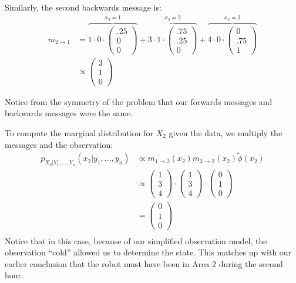 \documentclass[12pt]{article}
\begin{document}
{\begin{enumerate}[(a)]
            Similarly, the second backwards message is:
            \begin{align*}
                m_{2 \to 1} &= 
                \overbrace{1 \cdot 0 \cdot \begin{pmatrix} .25 \\ 0 \\ 0 \end{pmatrix}}^{x_2 = 1} +
                \overbrace{3 \cdot 1 \cdot \begin{pmatrix} .75 \\ .25 \\ 0 \end{pmatrix}}^{x_2 = 2} +
                \overbrace{4 \cdot 0 \cdot \begin{pmatrix} 0 \\ .75 \\ 1 \end{pmatrix}}^{x_2 = 3} \\
                &\propto \begin{pmatrix} 3 \\ 1 \\ 0 \end{pmatrix}
            \end{align*}

            Notice from the symmetry of the problem that our forwards messages and backwards messages
            were the same.

            To compute the marginal distribution for $X_2$ given the data, we multiply the messages and
            the observation:
            \begin{align*}
                p_{X_2 | Y_1, \ldots, Y_n}(x_2|y_1,\ldots,y_n) &\propto 
                    m_{1 \to 2}(x_2) 
                    m_{3 \to 2}(x_2) 
                    \tilde{\phi}(x_2) \\
                &\propto
                    \begin{pmatrix} 1 \\ 3 \\ 4 \end{pmatrix} \cdot
                    \begin{pmatrix} 1 \\ 3 \\ 4 \end{pmatrix} \cdot
                    \begin{pmatrix} 0 \\ 1 \\ 0 \end{pmatrix} \\
                &= \begin{pmatrix} 0 \\ 1 \\ 0 \end{pmatrix} \\
            \end{align*}
            Notice that in this case, because of our simplified observation model, the observation ``cold''
            allowed us to determine the state. This matches up with our earlier conclusion that the robot
            must have been in Area 2 during the second hour.


\end{enumerate}}
\end{document}
